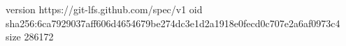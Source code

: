 version https://git-lfs.github.com/spec/v1
oid sha256:6ca7929037aff606d4654679be274dc3e1d2a1918e0fecd0c707e2a6af0973c4
size 286172
